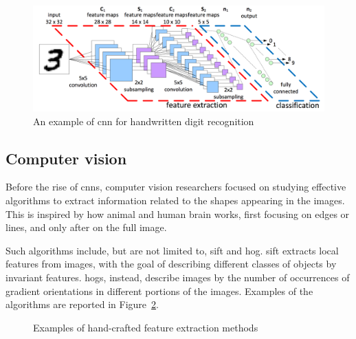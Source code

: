 \documentclass[%
    corpo=12pt,
    twoside,
    stile=classica,   
    tipotesi=magistrale,
    evenboxes,
    english,
	numerazioneromana,
]{toptesi}
\begin{document}
\begin{figure}
	\centering
	\includegraphics[width=.95\linewidth]{imgs/cnn.png}
	\caption{An example of \gls{cnn} for handwritten digit recognition}
	\label{fig:cnn}
\end{figure}

\subsection{Computer vision}
Before the rise of \glspl{cnn}, computer vision researchers focused on studying effective algorithms to extract information related to the shapes appearing in the images. This is inspired by how animal and human brain works, first focusing on edges or lines, and only after on the full image.

Such algorithms include, but are not limited to, \gls{sift} and \gls{hog}. \Gls{sift} extracts local features from images, with the goal of describing different classes of objects by invariant features\cite{lowe1999object}. \Glspl{hog}, instead, describe images by the number of occurrences of gradient orientations in different portions of the images\cite{dalal2005histograms}. Examples of the algorithms are reported in Figure~\ref{fig:sift_hog}.

\begin{figure}[ht]
	\centering
	\caption{Examples of hand-crafted feature extraction methods}
	\label{fig:sift_hog}
\end{figure}
\end{document}
